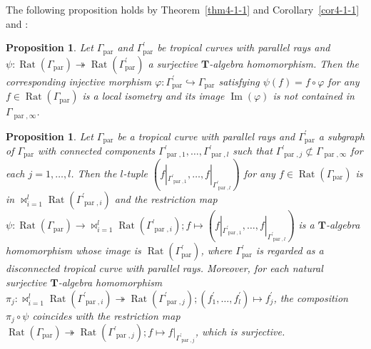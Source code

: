 \documentclass[a4paper,12pt]{amsart}
\newtheorem{prop}[dfn]{Proposition}
\def\Gamma{\varGamma}
\begin{document}
The following proposition holds by Theorem~\ref{thm4-1-1} and Corollary~\ref{cor4-1-1} and \cite[Theorem~3.14]{JuAe4}:

\begin{prop}
    \label{prop4-4-2}
Let $\Gamma_{\operatorname{par}}$ and $\Gamma^{\prime}_{\operatorname{par}}$ be tropical curves with parallel rays and $\psi : \operatorname{Rat}(\Gamma_{\operatorname{par}}) \twoheadrightarrow \operatorname{Rat}(\Gamma^{\prime}_{\operatorname{par}})$ a surjective $\boldsymbol{T}$-algebra homomorphism.
Then the corresponding injective morphism $\varphi : \Gamma^{\prime}_{\operatorname{par}} \hookrightarrow \Gamma_{\operatorname{par}}$ satisfying $\psi(f) = f \circ \varphi$ for any $f \in \operatorname{Rat}(\Gamma_{\operatorname{par}})$ is a local isometry and its image $\operatorname{Im}(\varphi)$ is not contained in $\Gamma_{\operatorname{par}, \infty}$.
\end{prop}

\begin{prop}
    \label{prop4-4-3}
Let $\Gamma_{\operatorname{par}}$ be a tropical curve with parallel rays and $\Gamma^{\prime}_{\operatorname{par}}$ a subgraph of $\Gamma_{\operatorname{par}}$ with connected components $\Gamma^{\prime}_{\operatorname{par}, 1}, \ldots, \Gamma^{\prime}_{\operatorname{par}, l}$ such that $\Gamma^{\prime}_{\operatorname{par}, j} \not\subset \Gamma_{\operatorname{par}, \infty}$ for each $j = 1, \ldots, l$.
Then the $l$-tuple $\left(f|_{\Gamma^{\prime}_{\operatorname{par}, 1}}, \ldots, f|_{\Gamma^{\prime}_{\operatorname{par}, l}} \right)$ for any $f \in \operatorname{Rat}(\Gamma_{\operatorname{par}})$ is in $\bowtie_{i = 1}^l \operatorname{Rat}(\Gamma_{\operatorname{par}, i}^{\prime})$ and the restriction map $\psi : \operatorname{Rat}(\Gamma_{\operatorname{par}}) \to \bowtie_{i = 1}^l \operatorname{Rat}(\Gamma_{\operatorname{par}, i}^{\prime}); f \mapsto \left(f|_{\Gamma^{\prime}_{\operatorname{par}, 1}}, \ldots, f|_{\Gamma^{\prime}_{\operatorname{par}, l}} \right)$ is a $\boldsymbol{T}$-algebra homomorphism whose image is $\operatorname{Rat}(\Gamma^{\prime}_{\operatorname{par}})$, where $\Gamma^{\prime}_{\operatorname{par}}$ is regarded as a disconnected tropical curve with parallel rays.
Moreover, for each natural surjective $\boldsymbol{T}$-algebra homomorphism $\pi_j : \bowtie_{i = 1}^l \operatorname{Rat}(\Gamma_{\operatorname{par}, i}^{\prime}) \twoheadrightarrow \operatorname{Rat}(\Gamma_{\operatorname{par}, j}^{\prime}); (f^{\prime}_1, \ldots, f^{\prime}_l) \mapsto f^{\prime}_j$, the composition $\pi_j \circ \psi$ coincides with the restriction map $\operatorname{Rat}(\Gamma_{\operatorname{par}}) \twoheadrightarrow \operatorname{Rat}(\Gamma_{\operatorname{par}, j}^{\prime}); f \mapsto f|_{\Gamma_{\operatorname{par}, j}^{\prime}}$, which is surjective.
\end{prop}
\end{document}
